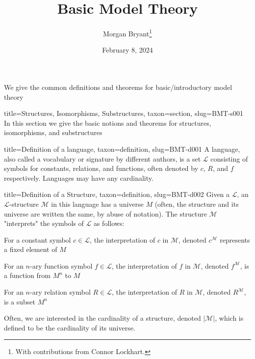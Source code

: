 \documentclass[a4paper]{article}
\title{Basic Model Theory}
\date{February 8, 2024}
\author{Morgan Bryant\thanks{With contributions from Connor Lockhart.}}
\begin{document}
\maketitle
\par{We give the common definitions and theorems for basic/introductory model theory}
\begin{tree}{title={Structures, Isomorphisms, Substructures}, taxon={section}, slug={BMT-s001}}
In this section we give the basic notions and theorems for structures, isomorphisms, and substructures
\begin{tree}{title={Definition of a language}, taxon={definition}, slug={BMT-d001}}
A language, also called a vocabulary or signature by different authors, is a set \(\mathcal {L}\) consisting of symbols for constants, relations, and functions, 
often denoted by \(c\), \(R\), and \(f\) respectively. Languages may have any cardinality.
\end{tree}

\begin{tree}{title={Definition of a Structure}, taxon={definition}, slug={BMT-d002}}
Given a  \(\mathcal {L}\), an \(\mathcal {L}\)-structure \(\mathcal {M}\) in this language has a universe \(M\) (often, the structure and its universe 
are written the same, by abuse of notation). The structure \(\mathcal {M}\) "interprets" the symbols of \(\mathcal {L}\) as follows:\par{For a constant symbol \(c \in   \mathcal {L}\), the interpretation of \(c\) in \(\mathcal {M}\), denoted \(c^{ \mathcal {M}}\) represents a fixed 
element of \(M\)}\par{For an \(n\)-ary function symbol \(f \in   \mathcal {L}\), the interpretation of \(f\) in \(\mathcal {M}\), denoted \(f^{ \mathcal {M}}\),
is a function from \(M^n\) to \(M\)}\par{For an \(n\)-ary relation symbol \(R \in   \mathcal {L}\), the interpretation of \(R\) in \(\mathcal {M}\), denoted \(R^{ \mathcal {M}}\),
is a subset \(M^n\)}\par{Often, we are interested in the cardinality of a structure, denoted \(| \mathcal {M}|\), which is defined to be the cardinality of its universe.}
\end{tree}


\end{tree}
\end{document}
